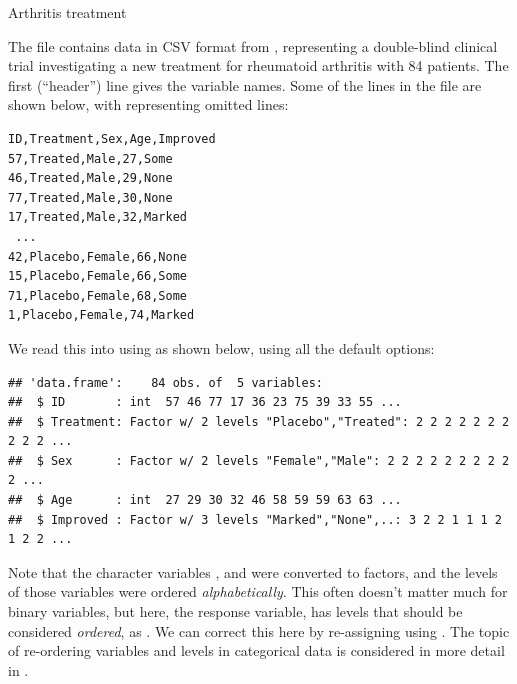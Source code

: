 \documentclass[11pt]{book}
\renewenvironment{knitrout}{\small\renewcommand{\baselinestretch}{.85}}{} %
\begin{document}
\begin{Example}{Arthritis treatment}

The file  contains data in CSV format
from \citet{KochEdwards:88}, representing
a double-blind clinical trial investigating a new treatment for rheumatoid arthritis with 84 patients. The first (``header'') line gives the variable names.  Some of the
lines in the file are shown below, with  representing omitted lines:
{\small
\renewcommand{\baselinestretch}{.85}
\begin{verbatim}
ID,Treatment,Sex,Age,Improved
57,Treated,Male,27,Some
46,Treated,Male,29,None
77,Treated,Male,30,None
17,Treated,Male,32,Marked
 ...
42,Placebo,Female,66,None
15,Placebo,Female,66,Some
71,Placebo,Female,68,Some
1,Placebo,Female,74,Marked
\end{verbatim}
}
We read this into \R using  as shown below, using all the
default options:
\begin{knitrout}\footnotesize
{}\color{fgcolor}\begin{kframe}
\begin{alltt}
 \hlkwb{<-} \hlstd{(}\hlstd{)}
\end{alltt}
\begin{verbatim}
## 'data.frame':	84 obs. of  5 variables:
##  $ ID       : int  57 46 77 17 36 23 75 39 33 55 ...
##  $ Treatment: Factor w/ 2 levels "Placebo","Treated": 2 2 2 2 2 2 2 2 2 2 ...
##  $ Sex      : Factor w/ 2 levels "Female","Male": 2 2 2 2 2 2 2 2 2 2 ...
##  $ Age      : int  27 29 30 32 46 58 59 59 63 63 ...
##  $ Improved : Factor w/ 3 levels "Marked","None",..: 3 2 2 1 1 1 2 1 2 2 ...
\end{verbatim}
\end{kframe}
\end{knitrout}
Note that the character variables ,  and 
were converted to factors, and the levels of those variables were
ordered \emph{alphabetically}.  This often doesn't matter much for binary variables,
but here, the response variable,  has levels
that should be considered \emph{ordered}, 
as .  We can correct this here by
re-assigning  using .
The topic of re-ordering variables and levels in categorical data is
considered in more detail in .


\end{Example}
\end{document}
